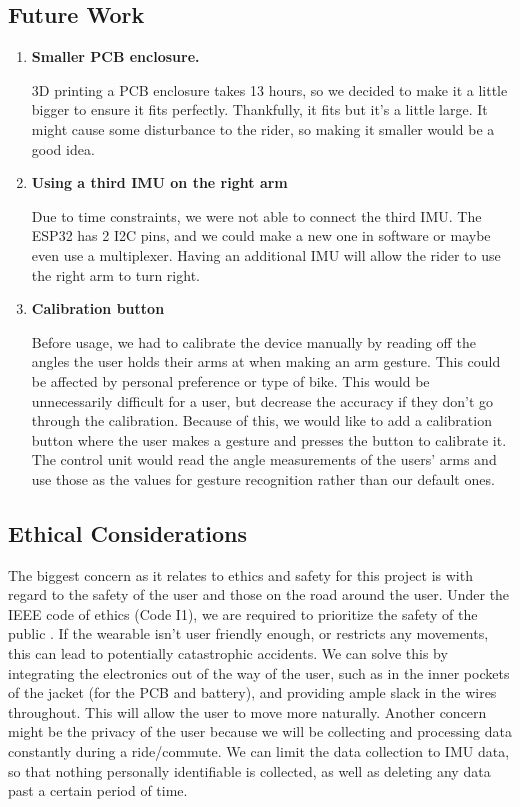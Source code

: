 \subsection{Future Work}
\begin{enumerate}
    \item \textbf{Smaller PCB enclosure.}
    
    3D printing a PCB enclosure takes 13 hours, so we decided to make it a little bigger to ensure it fits perfectly. Thankfully, it fits but it's a little large. It might cause some disturbance to the rider, so making it smaller would be a good idea.

    \item \textbf{Using a third IMU on the right arm}
    
    Due to time constraints, we were not able to connect the third IMU. The ESP32 has 2 I2C pins, and we could make a new one in software or maybe even use a multiplexer. Having an additional IMU will allow the rider to use the right arm to turn right.

    \item \textbf{Calibration button}
    
    Before usage, we had to calibrate the device manually by reading off the angles the user holds their arms at when making an arm gesture. This could be affected by personal preference or type of bike. This would be unnecessarily difficult for a user, but decrease the accuracy if they don’t go through the calibration. Because of this, we would like to add a calibration button where the user makes a gesture and presses the button to calibrate it. The control unit would read the angle measurements of the users' arms and use those as the values for gesture recognition rather than our default ones.
\end{enumerate}

\subsection{Ethical Considerations}
The biggest concern as it relates to ethics and safety for 
this project is with regard to the safety of the user and 
those on the road around the user. Under the IEEE code of 
ethics (Code I1), we are required to prioritize the 
safety of the public \cite{IEEEethics2024}. If the wearable isn’t user
friendly enough, or restricts any movements, this can lead 
to potentially catastrophic accidents. We can solve this by 
integrating the electronics out of the way of the user, 
such as in the inner pockets of the jacket (for the PCB 
and battery), and providing ample slack in the wires 
throughout. This will allow the user to move more naturally.
Another concern might be the privacy of the user \cite{IEEEethics2024}
because we will be collecting and processing data constantly 
during a ride/commute. We can limit the data collection to 
IMU data, so that nothing personally identifiable is
collected, as well as deleting any data past a certain 
period of time. 




